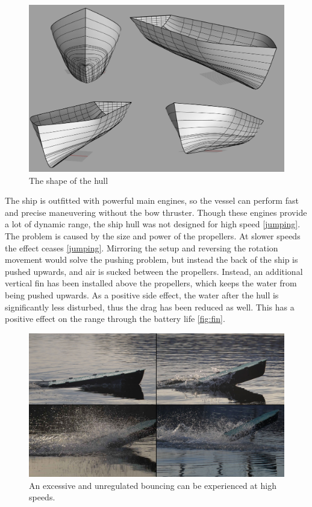 \begin{figure}[htbp]
	\centering
	\includegraphics[width=\textwidth]{img/render/rendermontage.png}
	\caption{The shape of the hull}
	\label{fig:hullshape}
\end{figure}

The ship is outfitted with powerful main engines, so the vessel can perform fast and precise maneuvering without the bow thruster. Though these engines provide a lot of dynamic range, the ship hull was not designed for high speed \ref{jumping}. The problem is caused by the size and power of the propellers. At slower speeds the effect ceases \ref{jumping}.
Mirroring the setup and reversing the rotation movement would solve the pushing problem, but instead the back of the ship is pushed upwards, and air is sucked between the propellers. Instead, an additional vertical fin has been installed above the propellers, which keeps the water from being pushed upwards. As a positive side effect, the water after the hull is significantly less disturbed, thus the drag has been reduced as well. This has a positive effect on the range through the battery life \ref{fig:fin}.

\begin{figure}[htbp]
	\centering
	\includegraphics[width=\textwidth]{Pictures/VerticalJumpingTele.jpg}
	\caption{An excessive and unregulated bouncing can be experienced at high speeds.}
	\label{fig:jumping}
\end{figure}

